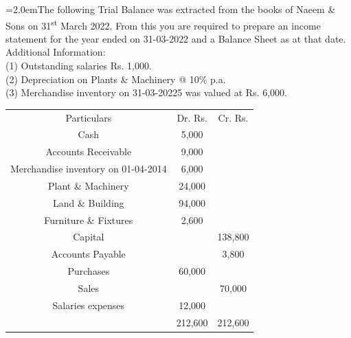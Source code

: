 \documentclass[11pt,a4paper]{article}
\newcommand{\lqn}[2]{\Needspace{6\baselineskip}\par\medskip\noindent\hangindent=2.0em\hangafter=1\makebox[2.0em][l]{\textbf{#1.}}#2\par}
\begin{document}
\lqn{117}{The following Trial Balance was extracted from the books of Naeem \& Sons on 31\textsuperscript{st} March 2022. From this you are required to prepare an income statement for the year ended on 31-03-2022 and a Balance Sheet as at that date.\\
Additional Information:\\
(1) Outstanding salaries Rs. 1,000.\\
(2) Depreciation on Plants \& Machinery @ 10\% p.a.\\
(3) Merchandise inventory on 31-03-20225 was valued at Rs. 6,000.\par
\par\smallskip\noindent\hspace*{1.2em}\begin{tabular}{|ccc|}
\hline
Particulars & Dr. Rs. & Cr. Rs. \\
Cash & 5,000 &  \\
Accounts Receivable & 9,000 &  \\
Merchandise inventory on 01-04-2014 & 6,000 &  \\
Plant \& Machinery & 24,000 &  \\
Land \& Building & 94,000 &  \\
Furniture \& Fixtures & 2,600 &  \\
Capital &  & 138,800 \\
Accounts Payable &  & 3,800 \\
Purchases & 60,000 &  \\
Sales &  & 70,000 \\
Salaries expenses & 12,000 &  \\
 & 212,600 & 212,600 \\
\hline
\end{tabular}\par\smallskip
}
\end{document}
